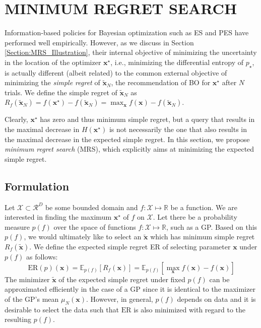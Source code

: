 \documentclass[10pt,letterpaper]{article} %
\begin{document}
\section{MINIMUM REGRET SEARCH} \label{Section:MRS}

Information-based policies for Bayesian optimization such as ES and PES
have performed well empirically. However, as we discuss in Section \ref{Section:MRS_Illustration},
their internal objective of minimizing
the uncertainty in the location of the optimizer $\mathbf{x}^\star$, i.e.,
minimizing the differential entropy of $p_\star$, is actually different (albeit
related) to the common external objective of minimizing the \emph{simple regret} of
$\mathbf{\tilde x}_N$, the recommendation of BO for $\mathbf{x}^\star$ after $N$
trials. We define the simple regret of $\mathbf{\tilde x}_N$ as
$R_f(\mathbf{\tilde  x}_N) = f(\mathbf{x}^\star) - f(\mathbf{\tilde  x}_N) = \max_{\mathbf{x}} f(\mathbf{x}) - f(\mathbf{\tilde x}_N)$.

Clearly, $\mathbf{x}^\star$ has zero and thus minimum simple regret, but a query that
results in the maximal decrease in $H(\mathbf{x}^\star)$ is not necessarily the
one that also results in the maximal decrease in the expected simple regret. 
In this section, we propose \emph{minimum regret search} (MRS), 
which explicitly aims at minimizing the expected simple
regret.

\subsection{Formulation}
Let $\mathcal{X} \subset \mathcal{R}^D$ be some bounded domain and $f: \mathcal{X} \mapsto
\mathbb{R}$ be a function. We are interested in finding the maximum
$\mathbf{x}^\star$ of $f$ on $\mathcal{X}$. Let there be a probability measure
$p(f)$ over the space of functions $f: \mathcal{X} \mapsto \mathbb{R}$, such as
a GP. Based on this $p(f)$, we would ultimately like to
select an $\mathbf{\tilde x}$ which has minimum simple regret
$R_f(\mathbf{\tilde x})$. We define the expected simple regret ER of
selecting parameter $\mathbf{x}$ under $p(f)$ as follows:
$$\text{ER}(p)(\mathbf{x}) = \mathbb{E}_{p(f)}[R_f(\mathbf{x})]
= \mathbb{E}_{p(f)}[\max_{\mathbf{x}} f(\mathbf{x}) - f(\mathbf{
x})]$$
The minimizer $\mathbf{\tilde x}$ of the expected simple regret under fixed $p(f)$ can be approximated efficiently in the case of a GP since it is identical to the maximizer of the GP's mean $\mu_N(\mathbf{x})$. However, in general, $p(f)$ depends on data and it is desirable to select the data such that $\text{ER}$ is also minimized with regard to the resulting $p(f)$.
\end{document}
